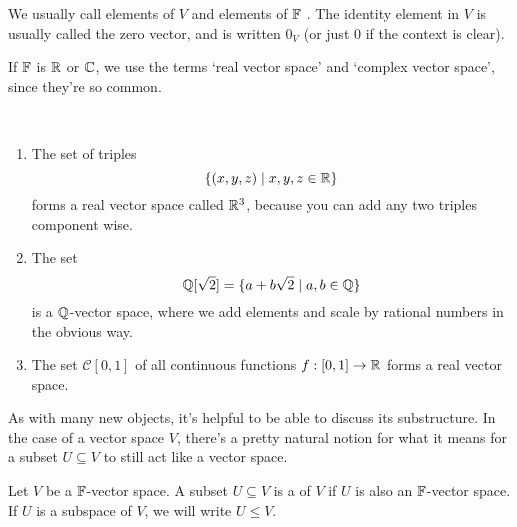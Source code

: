 \documentclass[a4paper]{scrartcl}
\begin{document}
We usually call elements of $V$  and elements of $\mathbb{F}$ . The identity element in $V$ is usually called the zero vector, and is written $0_V$ (or just $0$ if the context is clear).

If $\mathbb{F}$ is $\mathbb{R}$ or $\mathbb{C}$, we use the terms `real vector space' and `complex vector space', since they're so common. 


\begin{example}~
    \vspace{-1.5\baselineskip}
    \begin{enumerate}[label=(\roman*)]
        
        \item The set of triples
        $$
        \{(x, y, z) \mid x, y, z \in \mathbb{R}\}
        $$ 
        forms a real vector space called $\mathbb{R}^3$, because you can add any two triples component wise. 
        \item The set
        $$
        \mathbb{Q}[\sqrt{2}] = \{a + b\sqrt{2} \mid a, b \in \mathbb{Q}\}
        $$
        is a $\mathbb{Q}$-vector space, where we add elements and scale by rational numbers in the obvious way.
        \item The set $\mathcal{C}[0, 1]$ of all continuous functions $f: [0, 1] \rightarrow \mathbb{R}$ forms a real vector space.
    \end{enumerate}
\end{example}

As with many new objects, it's helpful to be able to discuss its substructure. In the case of a vector space $V$, there's a pretty natural notion for what it means for a subset $U \subseteq V$ to still act like a vector space.

\begin{definition}[Subspace]
    Let $V$ be a $\mathbb{F}$-vector space.
    A subset $U \subseteq V$ is a  of $V$ if $U$ is also an $\mathbb{F}$-vector space. If $U$ is a subspace of $V$, we will write $U \leq V$.
    
\end{definition}
\end{document}
